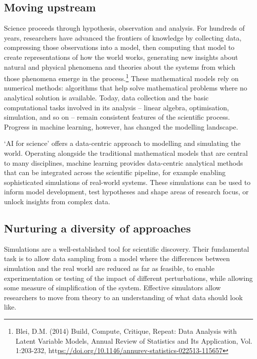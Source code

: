 {\hypertarget{moving-upstream}{%
\subsection{Moving upstream}\label{moving-upstream}}

Science proceeds through hypothesis, observation and analysis. For
hundreds of years, researchers have advanced the frontiers of knowledge
by collecting data, compressing those observations into a model, then
computing that model to create representations of how the world works,
generating new insights about natural and physical phenomena and
theories about the systems from which those phenomena emerge in the
process.\footnote{Blei, D.M. (2014) Build, Compute, Critique, Repeat:
  Data Analysis with Latent Variable Models, Annual Review of Statistics
  and Its Application, Vol. 1:203-232,
  htt\uline{ps://doi.org/10.1146/annurev-statistics-022513-115657}}
These mathematical models rely on numerical methods: algorithms that
help solve mathematical problems where no analytical solution is
available. Today, data collection and the basic computational tasks
involved in its analysis -- linear algebra, optimisation, simulation,
and so on -- remain consistent features of the scientific process.
Progress in machine learning, however, has changed the modelling
landscape.

`AI for science' offers a data-centric approach to modelling and
simulating the world. Operating alongside the traditional mathematical
models that are central to many disciplines, machine learning provides
data-centric analytical methods that can be integrated across the
scientific pipeline, for example enabling sophisticated simulations of
real-world systems. These simulations can be used to inform model
development, test hypotheses and shape areas of research focus, or
unlock insights from complex data.

\hypertarget{nurturing-a-diversity-of-approaches}{%
\subsection{Nurturing a diversity of
approaches}\label{nurturing-a-diversity-of-approaches}}

Simulations are a well-established tool for scientific discovery. Their
fundamental task is to allow data sampling from a model where the
differences between simulation and the real world are reduced as far as
feasible, to enable experimentation or testing of the impact of
different perturbations, while allowing some measure of simplification
of the system. Effective simulators allow researchers to move from
theory to an understanding of what data should look like.

}
